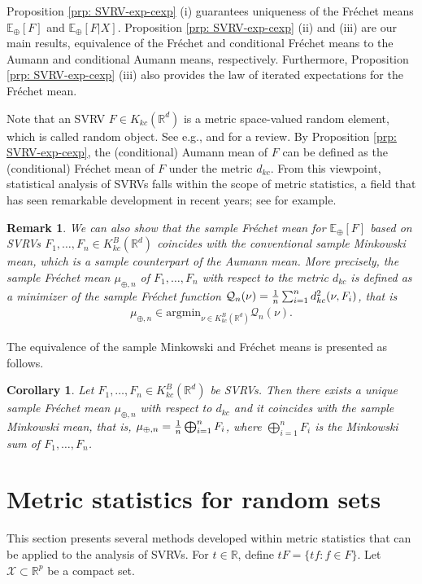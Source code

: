 \documentclass[11pt,reqno]{amsart}
\newtheorem{corollary}{Corollary}
\newtheorem{remark}{Remark}
\begin{document}
Proposition \ref{prp: SVRV-exp-cexp} (i) guarantees uniqueness of the Fr\'echet means $\mathbb{E}_\oplus[F]$ and $\mathbb{E}_\oplus[F|X]$. Proposition \ref{prp: SVRV-exp-cexp} (ii) and (iii) are our main results, equivalence of the Fr\'echet and conditional Fr\'echet means to the Aumann and conditional Aumann means, respectively. Furthermore, Proposition \ref{prp: SVRV-exp-cexp} (iii) also provides the law of iterated expectations for the Fr\'echet mean.

Note that an SVRV $F \in K_{kc}(\mathbb{R}^d)$ is a metric space-valued random element, which is called random object. See e.g., \cite{MaAl14} and \cite{MaDr21} for a review. By Proposition \ref{prp: SVRV-exp-cexp}, the (conditional) Aumann mean of $F$ can be defined as the (conditional) Fr\'echet mean of $F$ under the metric $d_{kc}$. From this viewpoint, statistical analysis of SVRVs falls within the scope of metric statistics, a field that has seen remarkable development in recent years; see \cite{DuChMu24} for example. 

\begin{remark}
We can also show that the sample Fr\'echet mean for $\mathbb{E}_\oplus[F]$ based on SVRVs $F_1,\dots, F_n \in K_{kc}^B(\mathbb{R}^d)$ coincides with the conventional sample Minkowski mean, which is a sample counterpart of the Aumann mean. More precisely, the sample Fr\'echet mean $\mu_{\oplus,n}$ of $F_1,\dots, F_n$ with respect to the metric $d_{kc}$ is defined as a minimizer of the sample Fr\'echet function $\mathcal{Q}_n(\nu)={1 \over n}\sum_{i=1}^nd_{kc}^2(\nu,F_i)$, that is
\begin{align*}
\mu_{\oplus,n} \in \mathrm{argmin}_{\nu \in K_{kc}^B(\mathbb{R}^d)}\mathcal{Q}_n(\nu).
\end{align*}      
\end{remark}

The equivalence of the sample Minkowski and Fr\'echet means is presented as follows.
\begin{corollary}\label{cor:sample-F-A-exp}
Let $F_1,\dots, F_n \in K_{kc}^B(\mathbb{R}^d)$ be SVRVs. Then there exists a unique sample Fr\'echet mean $\mu_{\oplus,n}$ with respect to $d_{kc}$ and it coincides with the sample Minkowski mean, that is, $\mu_{\oplus,n}={1 \over n} \bigoplus_{i=1}^n F_i$, where $\bigoplus_{i=1}^n F_i$ is the Minkowski sum of $F_1,\dots,F_n$. 
\end{corollary}

\section{Metric statistics for random sets}\label{sec:stat}
This section presents several methods developed within metric statistics that can be applied to the analysis of SVRVs. For $t \in \mathbb{R}$, define $t F = \{tf: f \in F\}$. Let $\mathcal{X} \subset \mathbb{R}^p$ be a compact set.
\end{document}
